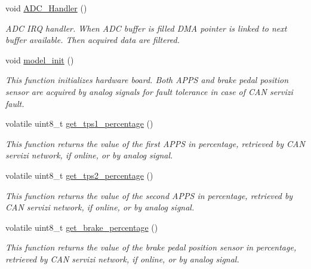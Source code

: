 \begin{DoxyCompactItemize}
\item 
void \mbox{\hyperlink{group___board__model__group_gaedc241164d501dcbc52cde232333c9cf}{A\+D\+C\+\_\+\+Handler}} ()
\begin{DoxyCompactList}\small\item\em A\+DC I\+RQ handler. When A\+DC buffer is filled D\+MA pointer is linked to next buffer available. Then acquired data are filtered. \end{DoxyCompactList}\item 
void \mbox{\hyperlink{group___board__model__group_gace5a444da39d4366693503c53f0841c2}{model\+\_\+init}} ()
\begin{DoxyCompactList}\small\item\em This function initializes hardware board. Both A\+P\+PS and brake pedal position sensor are acquired by analog signals for fault tolerance in case of C\+AN servizi fault. \end{DoxyCompactList}\item 
volatile uint8\+\_\+t \mbox{\hyperlink{group___board__model__group_ga9239a95f68fab3d9b6832fbe85eb87cd}{get\+\_\+tps1\+\_\+percentage}} ()
\begin{DoxyCompactList}\small\item\em This function returns the value of the first A\+P\+PS in percentage, retrieved by C\+AN servizi network, if online, or by analog signal. \end{DoxyCompactList}\item 
volatile uint8\+\_\+t \mbox{\hyperlink{group___board__model__group_gae563bbe9e3c31913df498ebd7cbf6c10}{get\+\_\+tps2\+\_\+percentage}} ()
\begin{DoxyCompactList}\small\item\em This function returns the value of the second A\+P\+PS in percentage, retrieved by C\+AN servizi network, if online, or by analog signal. \end{DoxyCompactList}\item 
volatile uint8\+\_\+t \mbox{\hyperlink{group___board__model__group_ga6db41e7368919bc4dfafaf4e400ae1a9}{get\+\_\+brake\+\_\+percentage}} ()
\begin{DoxyCompactList}\small\item\em This function returns the value of the brake pedal position sensor in percentage, retrieved by C\+AN servizi network, if online, or by analog signal. \end{DoxyCompactList}\item 

\end{DoxyCompactItemize}

